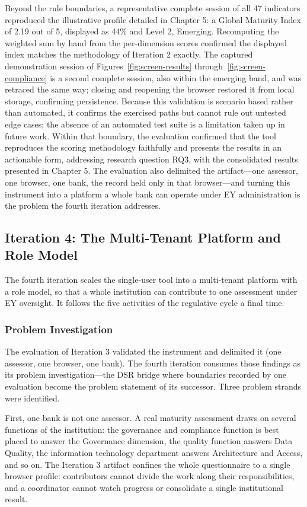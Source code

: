 Beyond the rule boundaries, a representative complete session of all 47 indicators reproduced the illustrative profile detailed in Chapter 5: a Global Maturity Index of 2.19 out of 5, displayed as 44\% and Level 2, Emerging. Recomputing the weighted sum by hand from the per-dimension scores confirmed the displayed index matches the methodology of Iteration 2 exactly. The captured demonstration session of Figures~\ref{fig:screen-results} through~\ref{fig:screen-compliance} is a second complete session, also within the emerging band, and was retraced the same way; closing and reopening the browser restored it from local storage, confirming persistence. Because this validation is scenario based rather than automated, it confirms the exercised paths but cannot rule out untested edge cases; the absence of an automated test suite is a limitation taken up in future work. Within that boundary, the evaluation confirmed that the tool reproduces the scoring methodology faithfully and presents the results in an actionable form, addressing research question RQ3, with the consolidated results presented in Chapter 5. The evaluation also delimited the artifact---one assessor, one browser, one bank, the record held only in that browser---and turning this instrument into a platform a whole bank can operate under EY administration is the problem the fourth iteration addresses.

\subsection{Iteration 4: The Multi-Tenant Platform and Role Model}

The fourth iteration scales the single-user tool into a multi-tenant platform with a role model, so that a whole institution can contribute to one assessment under EY oversight. It follows the five activities of the regulative cycle a final time.

\subsubsection{Problem Investigation}

The evaluation of Iteration 3 validated the instrument and delimited it (one assessor, one browser, one bank). The fourth iteration consumes those findings as its problem investigation---the DSR bridge where boundaries recorded by one evaluation become the problem statement of its successor. Three problem strands were identified.

First, one bank is not one assessor. A real maturity assessment draws on several functions of the institution: the governance and compliance function is best placed to answer the Governance dimension, the quality function answers Data Quality, the information technology department answers Architecture and Access, and so on. The Iteration 3 artifact confines the whole questionnaire to a single browser profile: contributors cannot divide the work along their responsibilities, and a coordinator cannot watch progress or consolidate a single institutional result.

